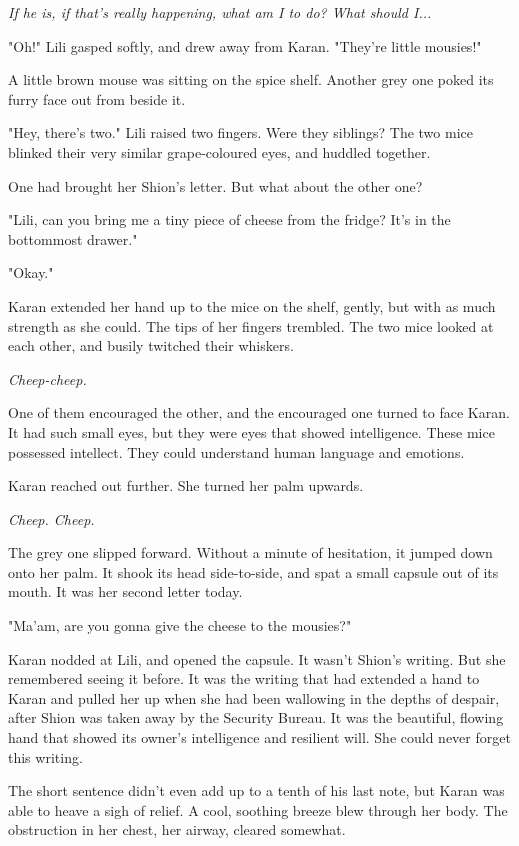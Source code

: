 \emph{If he is, if that's really happening, what am I to do? What should I...}

"Oh!" Lili gasped softly, and drew away from Karan. "They're little
mousies!"

A little brown mouse was sitting on the spice shelf. Another grey one
poked its furry face out from beside it.

"Hey, there's two." Lili raised two fingers. Were they siblings? The two
mice blinked their very similar grape-coloured eyes, and huddled
together.

One had brought her Shion's letter. But what about the other one?

"Lili, can you bring me a tiny piece of cheese from the fridge? It's in
the bottommost drawer."

"Okay."

Karan extended her hand up to the mice on the shelf, gently, but with as
much strength as she could. The tips of her fingers trembled. The two
mice looked at each other, and busily twitched their whiskers.

\emph{Cheep-cheep.}

One of them encouraged the other, and the encouraged one turned to face
Karan. It had such small eyes, but they were eyes that showed
intelligence. These mice possessed intellect. They could understand
human language and emotions.

Karan reached out further. She turned her palm upwards.

\emph{Cheep. Cheep.}

The grey one slipped forward. Without a minute of hesitation, it jumped
down onto her palm. It shook its head side-to-side, and spat a small
capsule out of its mouth. It was her second letter today.

"Ma'am, are you gonna give the cheese to the mousies?"

Karan nodded at Lili, and opened the capsule. It wasn't Shion's writing.
But she remembered seeing it before. It was the writing that had
extended a hand to Karan and pulled her up when she had been wallowing
in the depths of despair, after Shion was taken away by the Security
Bureau. It was the beautiful, flowing hand that showed its owner's
intelligence and resilient will. She could never forget this writing.


The short sentence didn't even add up to a tenth of his last note, but
Karan was able to heave a sigh of relief. A cool, soothing breeze blew
through her body. The obstruction in her chest, her airway, cleared
somewhat.

